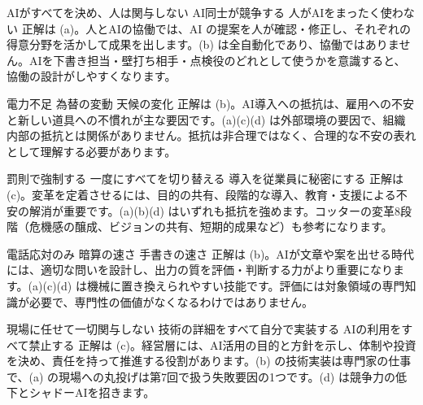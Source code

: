 
%
  {}%
  {AIがすべてを決め、人は関与しない}%
  {AI同士が競争する}%
  {人がAIをまったく使わない}%
  {正解は (a)。人とAIの協働では、AI の提案を人が確認・修正し、それぞれの得意分野を活かして成果を出します。(b) は全自動化であり、協働ではありません。AIを下書き担当・壁打ち相手・点検役のどれとして使うかを意識すると、協働の設計がしやすくなります。}

%
  {電力不足}%
  {}%
  {為替の変動}%
  {天候の変化}%
  {正解は (b)。AI導入への抵抗は、雇用への不安と新しい道具への不慣れが主な要因です。(a)(c)(d) は外部環境の要因で、組織内部の抵抗とは関係がありません。抵抗は非合理ではなく、合理的な不安の表れとして理解する必要があります。}

%
  {罰則で強制する}%
  {一度にすべてを切り替える}%
  {}%
  {導入を従業員に秘密にする}%
  {正解は (c)。変革を定着させるには、目的の共有、段階的な導入、教育・支援による不安の解消が重要です。(a)(b)(d) はいずれも抵抗を強めます。コッターの変革8段階（危機感の醸成、ビジョンの共有、短期的成果など）も参考になります。}

%
  {電話応対のみ}%
  {}%
  {暗算の速さ}%
  {手書きの速さ}%
  {正解は (b)。AIが文章や案を出せる時代には、適切な問いを設計し、出力の質を評価・判断する力がより重要になります。(a)(c)(d) は機械に置き換えられやすい技能です。評価には対象領域の専門知識が必要で、専門性の価値がなくなるわけではありません。}

%
  {現場に任せて一切関与しない}%
  {技術の詳細をすべて自分で実装する}%
  {}%
  {AIの利用をすべて禁止する}%
  {正解は (c)。経営層には、AI活用の目的と方針を示し、体制や投資を決め、責任を持って推進する役割があります。(b) の技術実装は専門家の仕事で、(a) の現場への丸投げは第7回で扱う失敗要因の1つです。(d) は競争力の低下とシャドーAIを招きます。}
